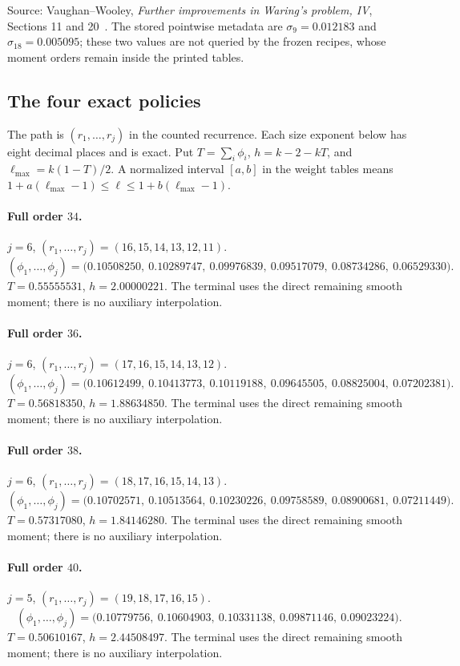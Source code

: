 \documentclass[11pt,letterpaper]{article}
\numberwithin{equation}{section}
\begin{document}
Source: Vaughan--Wooley, \emph{Further improvements in Waring's problem, IV}, Sections 11 and 20~\cite{VW00}.
The stored pointwise metadata are $\sigma_{9}=0.012183$ and $\sigma_{18}=0.005095$; these two values are not queried by the frozen recipes, whose moment orders remain inside the printed tables.
\subsection{The four exact policies}
The path is $(r_1,\ldots,r_j)$ in the counted recurrence.
Each size exponent below has eight decimal places and is exact.
Put $T=\sum_i\phi_i$, $h=k-2-kT$, and $\ell_{\max}=k(1-T)/2$.
A normalized interval $[a,b]$ in the weight tables means
$1+a(\ell_{\max}-1)\le\ell\le1+b(\ell_{\max}-1)$.
\paragraph{Full order $34$.}
$j=6$, $(r_1,\ldots,r_j)=(16,15,14,13,12,11)$.
\[ (\phi_1,\ldots,\phi_j)=\bigl(0.10508250,\ 0.10289747,\ 0.09976839,\ 0.09517079,\ 0.08734286,\ 0.06529330\bigr). \]
$T=0.55555531$, $h=2.00000221$.
The terminal uses the direct remaining smooth moment; there is no auxiliary interpolation.
\paragraph{Full order $36$.}
$j=6$, $(r_1,\ldots,r_j)=(17,16,15,14,13,12)$.
\[ (\phi_1,\ldots,\phi_j)=\bigl(0.10612499,\ 0.10413773,\ 0.10119188,\ 0.09645505,\ 0.08825004,\ 0.07202381\bigr). \]
$T=0.56818350$, $h=1.88634850$.
The terminal uses the direct remaining smooth moment; there is no auxiliary interpolation.
\paragraph{Full order $38$.}
$j=6$, $(r_1,\ldots,r_j)=(18,17,16,15,14,13)$.
\[ (\phi_1,\ldots,\phi_j)=\bigl(0.10702571,\ 0.10513564,\ 0.10230226,\ 0.09758589,\ 0.08900681,\ 0.07211449\bigr). \]
$T=0.57317080$, $h=1.84146280$.
The terminal uses the direct remaining smooth moment; there is no auxiliary interpolation.
\paragraph{Full order $40$.}
$j=5$, $(r_1,\ldots,r_j)=(19,18,17,16,15)$.
\[ (\phi_1,\ldots,\phi_j)=\bigl(0.10779756,\ 0.10604903,\ 0.10331138,\ 0.09871146,\ 0.09023224\bigr). \]
$T=0.50610167$, $h=2.44508497$.
The terminal uses the direct remaining smooth moment; there is no auxiliary interpolation.
\end{document}
